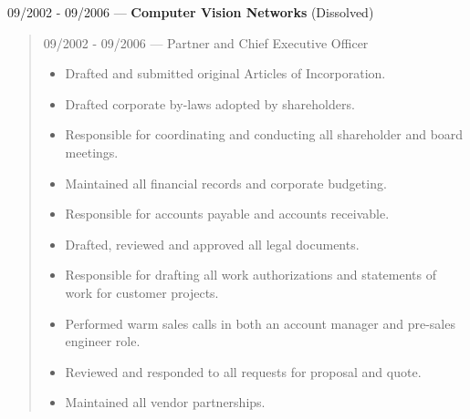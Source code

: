 09/2002 - 09/2006 --- {\bf Computer Vision Networks} (Dissolved)
\begin{quote}
09/2002 - 09/2006 --- Partner and Chief Executive Officer\\
\begin{itemize}
\item Drafted and submitted original Articles of Incorporation.
\item Drafted corporate by-laws adopted by shareholders.
\item Responsible for coordinating and conducting all shareholder and board
meetings.
\item Maintained all financial records and corporate budgeting.
\item Responsible for accounts payable and accounts receivable.
\item Drafted, reviewed and approved all legal documents.
\item Responsible for drafting all work authorizations and statements of work
for customer projects.
\item Performed warm sales calls in both an account manager and pre-sales
engineer role.
\item Reviewed and responded to all requests for proposal and quote.
\item Maintained all vendor partnerships.
\end{itemize}
\end{quote}
